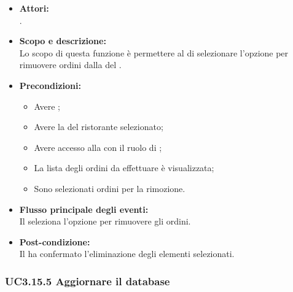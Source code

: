 \begin{itemize}
	\item \textbf{Attori:}
	\\.
	\item \textbf{Scopo e descrizione:} 
	\\Lo scopo di questa funzione è permettere al  di selezionare l'opzione per rimuovere ordini dalla  del .
	\item \textbf{Precondizioni:}
	\begin{itemize}
		\item Avere ;
		\item Avere la  del ristorante selezionato;
		\item Avere accesso alla  con il ruolo di ;
		\item La lista degli ordini da effettuare è visualizzata;
		\item Sono selezionati ordini per la rimozione.
	\end{itemize}
	\item \textbf{Flusso principale degli eventi:}
	\\Il {} seleziona l'opzione per rimuovere gli ordini.
	\item \textbf{Post-condizione:}
	\\Il {} ha confermato l'eliminazione degli elementi selezionati.
\end{itemize}

\subsubsection{UC3.15.5 Aggiornare il database} \label{UC3.15.5}

